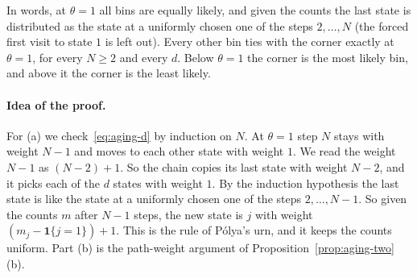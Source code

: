 In words, at $\theta=1$ all bins are equally likely, and given the counts the
last state is distributed as the state at a uniformly chosen one of the steps
$2,\dots,N$ (the forced first visit to state $1$ is left out). Every other bin
ties with the corner exactly at $\theta=1$, for every $N\ge2$ and every $d$.
Below $\theta=1$ the corner is the most likely bin, and above it the corner
is the least likely.

\paragraph{Idea of the proof.}
For (a) we check~\eqref{eq:aging-d} by induction on $N$. At $\theta=1$ step
$N$ stays with weight $N-1$ and moves to each other state with weight $1$. We
read the weight $N-1$ as $(N-2)+1$. So the chain copies its last state with
weight $N-2$, and it picks each of the $d$ states with weight $1$. By the
induction hypothesis the last state is like the state at a uniformly chosen
one of the steps $2,\dots,N-1$. So given the counts $m$ after $N-1$ steps, the
new state is $j$ with weight $(m_j-\mathbf 1\{j=1\})+1$. This is the rule of
P\'olya's urn, and it keeps the counts uniform. Part (b) is the path-weight
argument of Proposition~\ref{prop:aging-two}(b).


